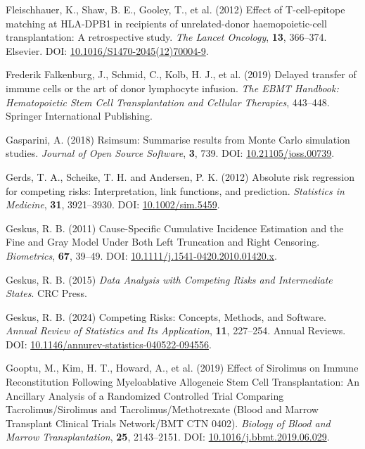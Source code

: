 \documentclass[
  letterpaper,
  DIV=11,
  numbers=noendperiod]{scrreprt}
\newlength{\cslhangindent}
\newenvironment{CSLReferences}[2] %
 {\begin{list}{}{%
  \setlength{\itemindent}{0pt}
  \setlength{\leftmargin}{0pt}
  \setlength{\parsep}{0pt}
  \ifodd #1
   \setlength{\leftmargin}{\cslhangindent}
   \setlength{\itemindent}{-1\cslhangindent}
  \fi
  \setlength{\itemsep}{#2\baselineskip}}}
 {\end{list}}
\begin{document}
\begin{CSLReferences}{1}{1}
Fleischhauer, K., Shaw, B. E., Gooley, T., et al. (2012) Effect of
{T-cell-epitope} matching at {HLA-DPB1} in recipients of unrelated-donor
haemopoietic-cell transplantation: A retrospective study. \emph{The
Lancet Oncology}, \textbf{13}, 366--374. Elsevier. DOI:
\href{https://doi.org/10.1016/S1470-2045(12)70004-9}{10.1016/S1470-2045(12)70004-9}.

Frederik Falkenburg, J., Schmid, C., Kolb, H. J., et al. (2019) Delayed
transfer of immune cells or the art of donor lymphocyte infusion.
\emph{The EBMT Handbook: Hematopoietic Stem Cell Transplantation and
Cellular Therapies}, 443--448. Springer International Publishing.

Gasparini, A. (2018) Rsimsum: {Summarise} results from {Monte Carlo}
simulation studies. \emph{Journal of Open Source Software}, \textbf{3},
739. DOI:
\href{https://doi.org/10.21105/joss.00739}{10.21105/joss.00739}.

Gerds, T. A., Scheike, T. H. and Andersen, P. K. (2012) Absolute risk
regression for competing risks: Interpretation, link functions, and
prediction. \emph{Statistics in Medicine}, \textbf{31}, 3921--3930. DOI:
\href{https://doi.org/10.1002/sim.5459}{10.1002/sim.5459}.

Geskus, R. B. (2011) Cause-{Specific Cumulative Incidence Estimation}
and the {Fine} and {Gray Model Under Both Left Truncation} and {Right
Censoring}. \emph{Biometrics}, \textbf{67}, 39--49. DOI:
\href{https://doi.org/10.1111/j.1541-0420.2010.01420.x}{10.1111/j.1541-0420.2010.01420.x}.

Geskus, R. B. (2015) \emph{Data Analysis with Competing Risks and
Intermediate States}. CRC Press.

Geskus, R. B. (2024) Competing {Risks}: {Concepts}, {Methods}, and
{Software}. \emph{Annual Review of Statistics and Its Application},
\textbf{11}, 227--254. Annual Reviews. DOI:
\href{https://doi.org/10.1146/annurev-statistics-040522-094556}{10.1146/annurev-statistics-040522-094556}.

Gooptu, M., Kim, H. T., Howard, A., et al. (2019) Effect of {Sirolimus}
on {Immune Reconstitution Following Myeloablative Allogeneic Stem Cell
Transplantation}: {An Ancillary Analysis} of a {Randomized Controlled
Trial Comparing Tacrolimus}/{Sirolimus} and {Tacrolimus}/{Methotrexate}
({Blood} and {Marrow Transplant Clinical Trials Network}/{BMT CTN}
0402). \emph{Biology of Blood and Marrow Transplantation}, \textbf{25},
2143--2151. DOI:
\href{https://doi.org/10.1016/j.bbmt.2019.06.029}{10.1016/j.bbmt.2019.06.029}.


\end{CSLReferences}
\end{document}
